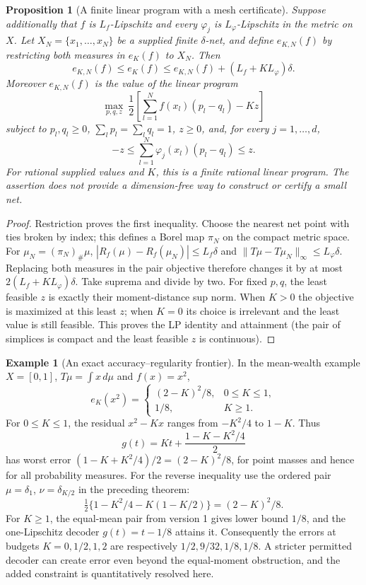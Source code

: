 \documentclass[11pt]{article}
\newtheorem{proposition}{Proposition}
\theoremstyle{definition}
\newtheorem{example}{Example}
\begin{document}
\begin{proposition}[A finite linear program with a mesh certificate]
Suppose additionally that $f$ is $L_f$-Lipschitz and every $\varphi_j$ is
$L_\varphi$-Lipschitz in the metric on $X$. Let
$X_N=\{x_1,\ldots,x_N\}$ be a supplied finite $\delta$-net, and define
$e_{K,N}(f)$ by restricting both measures in $e_K(f)$ to $X_N$. Then
\[
 e_{K,N}(f)\leq e_K(f)
       \leq e_{K,N}(f)+(L_f+KL_\varphi)\delta.
\]
Moreover $e_{K,N}(f)$ is the value of the linear program
\[
 \max_{p,q,z}\ \frac12\left[\sum_{l=1}^Nf(x_l)(p_l-q_l)-Kz\right]
\]
subject to $p_l,q_l\geq0$, $\sum_lp_l=\sum_lq_l=1$, $z\geq0$, and,
for every $j=1,\ldots,d$,
\[
 -z\leq\sum_{l=1}^N\varphi_j(x_l)(p_l-q_l)\leq z.
\]
For rational supplied values and $K$, this is a finite rational linear
program. The assertion does not provide a dimension-free way to construct
or certify a small net.
\end{proposition}
\begin{proof}
Restriction proves the first inequality. Choose the nearest net point with
ties broken by index; this defines a Borel map $\pi_N$ on the compact metric
space. For $\mu_N=(\pi_N)_\#\mu$,
$|R_f(\mu)-R_f(\mu_N)|\leq L_f\delta$ and
$\|T\mu-T\mu_N\|_\infty\leq L_\varphi\delta$.
Replacing both measures in the pair objective therefore changes it by at
most $2(L_f+KL_\varphi)\delta$. Take suprema and divide by two.
For fixed $p,q$, the least feasible $z$ is exactly their moment-distance
sup norm. When $K>0$ the objective is maximized at this least $z$; when
$K=0$ its choice is irrelevant and the least value is still feasible.
This proves the LP identity and attainment (the pair of simplices is
compact and the least feasible $z$ is continuous).
\end{proof}

\begin{example}[An exact accuracy--regularity frontier]
In the mean-wealth example $X=[0,1]$, $T\mu=\int x\,d\mu$ and $f(x)=x^2$,
\[
 e_K(x^2)=
 \begin{cases}
 (2-K)^2/8,&0\leq K\leq1,\\
 1/8,&K\geq1.
 \end{cases}
\]
For $0\leq K\leq1$, the residual $x^2-Kx$ ranges from $-K^2/4$
to $1-K$. Thus
\[
 g(t)=Kt+\frac{1-K-K^2/4}{2}
\]
has worst error $(1-K+K^2/4)/2=(2-K)^2/8$, for point masses and hence
for all probability measures. For the reverse inequality use the ordered
pair $\mu=\delta_1$, $\nu=\delta_{K/2}$ in the preceding theorem:
\[
 \tfrac12\{1-K^2/4-K(1-K/2)\}=(2-K)^2/8.
\]
For $K\geq1$, the equal-mean pair from version 1 gives lower bound $1/8$,
and the one-Lipschitz decoder $g(t)=t-1/8$ attains it. Consequently the
errors at budgets $K=0,1/2,1,2$ are respectively $1/2,9/32,1/8,1/8$.
A stricter permitted decoder can create error even beyond the equal-moment
obstruction, and the added constraint is quantitatively resolved here.
\end{example}
\end{document}

